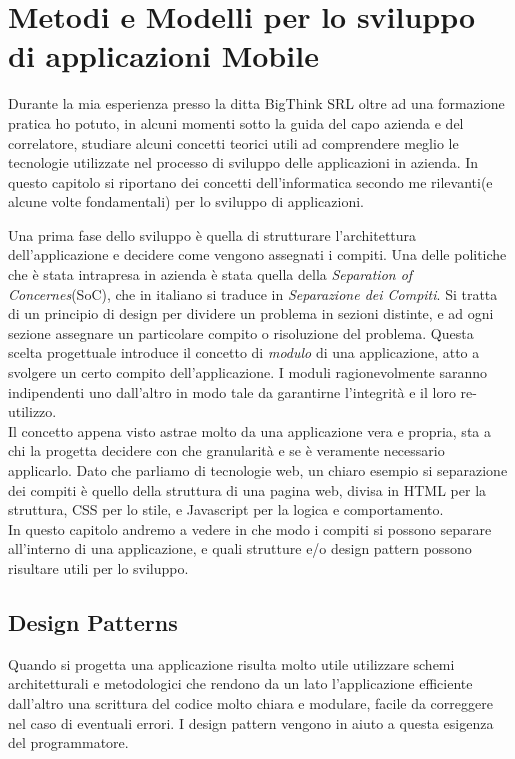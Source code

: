\chapter{Metodi e Modelli per lo sviluppo di applicazioni Mobile}
Durante la mia esperienza presso la ditta BigThink SRL oltre ad una formazione pratica ho potuto, in alcuni momenti sotto la guida del capo azienda e del correlatore, studiare alcuni concetti teorici utili ad comprendere meglio le tecnologie utilizzate nel processo di sviluppo delle applicazioni in azienda. In questo capitolo si riportano dei concetti dell'informatica secondo me rilevanti(e alcune volte fondamentali) per lo sviluppo di applicazioni.

Una prima fase dello sviluppo è quella di strutturare l'architettura dell'applicazione e decidere come vengono assegnati i compiti. Una delle politiche che è stata intrapresa in azienda è stata quella della \emph{Separation of Concernes}(SoC), che in italiano si traduce in \emph{Separazione dei Compiti}. Si tratta di un principio di design per dividere un problema in sezioni distinte, e ad ogni sezione assegnare un particolare compito o risoluzione del problema. Questa scelta progettuale introduce il concetto di \emph{modulo} di una applicazione, atto a svolgere un certo compito dell'applicazione. I moduli ragionevolmente saranno indipendenti uno dall'altro in modo tale da garantirne l'integrità e il loro re-utilizzo.\cite{wiki:soc}\\

Il concetto appena visto astrae molto da una applicazione vera e propria, sta a chi la progetta decidere con che granularità  e se è veramente necessario applicarlo. Dato che parliamo di tecnologie web, un chiaro esempio si separazione dei compiti è quello della struttura di una pagina web, divisa in HTML per la struttura, CSS per lo stile, e Javascript per la logica e comportamento.\\

In questo capitolo andremo a vedere in che modo i compiti si possono separare all'interno di una applicazione, e quali strutture e/o design pattern possono risultare utili per lo sviluppo.
 
\section{Design Patterns}

Quando si progetta una applicazione risulta molto utile utilizzare schemi architetturali e metodologici che rendono da un lato l'applicazione efficiente dall'altro una scrittura del codice molto chiara e modulare, facile da correggere nel caso di eventuali errori. I design pattern vengono in aiuto a questa esigenza del programmatore.

